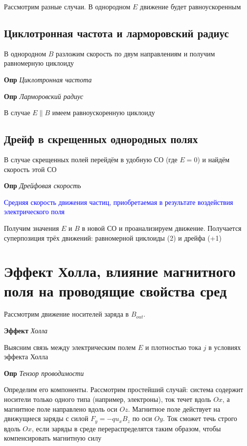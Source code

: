 \documentclass[a4paper, 14pt]{article}
\begin{document}
    Рассмотрим разные случаи.
    В однородном $E$ движение будет равноускоренным
    
    \subsection{Циклотронная частота и ларморовский радиус}
    
    В однородном $B$ разложим скорость по двум направлениям и получим равномерную циклоиду
    
    \textbf{Опр} \textit{Циклотронная частота}
    
    \textbf{Опр} \textit{Ларморовский радиус}
    
    В случае $E \| B$ имеем равноускоренную циклоиду
    
    \subsection{Дрейф в скрещенных однородных полях}
    
    В случае скрещенных полей перейдём в удобную СО (где $E = 0$) и найдём скорость этой СО
    
    \textbf{Опр} \textit{Дрейфовая скорость}
    
    \textcolor{blue}{Средняя скорость движения частиц, приобретаемая в результате воздействия электрического поля}
    
    Получим значения $E$ и $B$ в новой СО и проанализируем движение.
    Получается суперпозиция трёх движений: равномерной циклоиды (2) и дрейфа (+1)
    
    \section{Эффект Холла, влияние магнитного поля на проводящие свойства сред}
    
    Рассмотрим движение носителей заряда в $B_{out}$.
    
    \textbf{Эффект} \textit{Холла}
    
    Выясним связь между электрическим полем $E$ и плотностью тока $j$ в условиях эффекта Холла
    
    \textbf{Опр} \textit{Тензор проводимости}
    
    Определим его компоненты.
    Рассмотрим простейший случай: система содержит носители только одного типа (например, электроны), ток течет вдоль
    $Ox$, а магнитное поле направлено вдоль оси $Oz$.
    Магнитное поле действует на движущиеся заряды с силой $F_y = -q u_x B_z$ по оси $Oy$.
    Ток сможет течь строго вдоль $Ox$, если заряды в среде перераспределятся таким образом, чтобы компенсировать
    магнитную силу
    
\end{document}

